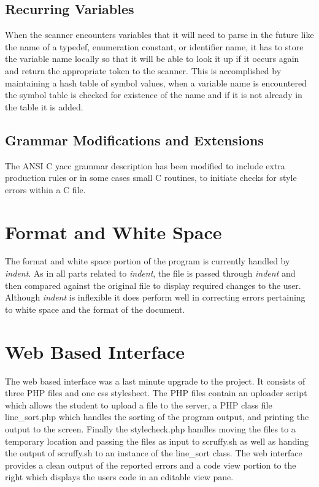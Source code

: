 \subsection{Recurring Variables}
When the scanner encounters variables that it will need to parse in the future 
like the name of a typedef, enumeration constant, or identifier name, it has to
store the variable name locally so that it will be able to look it up if it 
occurs again and return the appropriate token to the scanner. This is 
accomplished by maintaining a hash table of symbol values, when a variable name
is encountered the symbol table is checked for existence of the name and if it 
is not already in the table it is added.

\subsection{Grammar Modifications and Extensions}
The ANSI C yacc grammar description has been modified to include extra 
production rules or in some cases small C routines, to initiate checks for 
style errors within a C file. 

\section{Format and White Space}
The format and white space portion of the program is currently handled by 
\emph{indent}. As in all parts related to \emph{indent}, the file is passed 
through \emph{indent} and then compared against the original file to display 
required changes to the user. Although \emph{indent} is inflexible it does 
perform well in correcting errors pertaining to white space and the format of 
the document.

\section{Web Based Interface}
The web based interface was a last minute upgrade to the project. It consists 
of three PHP files and one css stylesheet. The PHP files contain an uploader
script which allows the student to upload a file to the server, a PHP class 
file line\_sort.php which handles the sorting of the program output, and 
printing the output to the screen. Finally the stylecheck.php handles moving 
the files to a temporary location and passing the files as input to scruffy.sh
as well as handing the output of scruffy.sh to an instance of the line\_sort 
class. 
The web interface provides a clean output of the reported errors and a code 
view portion to the right which displays the users code in an editable view 
pane.
